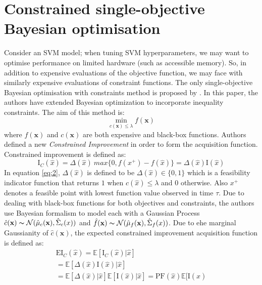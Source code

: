 \section{Constrained single-objective Bayesian optimisation}
Consider an SVM model; when tuning SVM hyperparameters, we may want to optimise performance on limited hardware (such as accessible memory). So, in addition to expensive evaluations of the objective function, we may face with similarly expensive evaluations of constraint functions. The only single-objective Bayesian optimisation with constraints method is proposed by \cite{gardner2014bayesian}. In this paper, the authors have extended Bayesian optimization to incorporate inequality constraints. The aim of this method is:
\begin{equation}
\operatorname*{min}_{c(\textbf{x}) \leq \lambda} f(\textbf{x})	
\label{eq:1}
\end{equation}
where $f(\textbf{x})$ and $c(\textbf{x})$ are both expensive and black-box functions. Authors defined a new \textit{Constrained Improvement} in order to form the acquisition function. Constrained improvement is defined as:
\begin{equation}
\mathrm{I}_C(\hat{x}) = \Delta(\hat{x})\ max\{0,f(x^{+})-f(\hat{x})\} = \Delta(\hat{x})\mathrm{I}(\hat{x})
\label{eq:2}
\end{equation}
In equation \ref{eq:2}, $\Delta(\hat{x})$ is defined to be $\Delta(\hat{x}) \in \{0,1\}$ which is a feasibility indicator function that returns $1$ when $c(\hat{x}) \leq \lambda$ and $0$ otherwise. Also $x^+$ denotes a feasible point with lowest function value observed in time $\tau$. Due to dealing with black-box functions for both objectives and constraints, the authors use Bayesian formalism to model each with a Gaussian Process $\hat{c}(\textbf{x}) \thicksim
 \mathcal{N}(\hat{\mu}_{c}(\textbf{x}),\hat{\Sigma}_c(x))$ and $\hat{f}(\textbf{x}) \thicksim \mathcal{N}(\hat{\mu}_{f}(\textbf{x}),\hat{\Sigma}_f(x))$.
Due to ehe marginal Gaussianity of $\hat{c}(\textbf{x})$, the expected constrained improvement acquisition function is defined as:
\begin{align*}
\mathrm{EI}_C(\hat{x}) = \mathbb{E}[\mathrm{I}_C(\hat{x})|\hat{x}]\\
		     		   = \mathbb{E}[\Delta(\hat{x})\mathrm{I}(\hat{x})|\hat{x}]\\
					   = \mathbb{E}[\Delta(\hat{x})|\hat{x}]\mathbb{E}[\mathrm{I}(\hat{x})|\hat{x}]
   					   = \mathrm{PF}(\hat{x})\mathbb{E}[\mathrm{I}(\hat{x})
\label{eq:3}
\end{align*}
